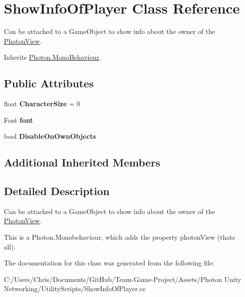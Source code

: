 \hypertarget{class_show_info_of_player}{}\section{Show\+Info\+Of\+Player Class Reference}
\label{class_show_info_of_player}


Can be attached to a Game\+Object to show info about the owner of the \hyperlink{class_photon_view}{Photon\+View}.  




Inherits \hyperlink{class_photon_1_1_mono_behaviour}{Photon.\+Mono\+Behaviour}.

\subsection*{Public Attributes}
\begin{DoxyCompactItemize}
\item 
float {\bfseries Character\+Size} = 0\hypertarget{class_show_info_of_player_a3ca691afacbede3ba6003e9fe9382122}{}\label{class_show_info_of_player_a3ca691afacbede3ba6003e9fe9382122}

\item 
Font {\bfseries font}\hypertarget{class_show_info_of_player_ad21009b17d92004b3172cc7e63eac70e}{}\label{class_show_info_of_player_ad21009b17d92004b3172cc7e63eac70e}

\item 
bool {\bfseries Disable\+On\+Own\+Objects}\hypertarget{class_show_info_of_player_a4f3344f49a450e169bce73cb3c1acd42}{}\label{class_show_info_of_player_a4f3344f49a450e169bce73cb3c1acd42}

\end{DoxyCompactItemize}
\subsection*{Additional Inherited Members}


\subsection{Detailed Description}
Can be attached to a Game\+Object to show info about the owner of the \hyperlink{class_photon_view}{Photon\+View}. 

This is a Photon.\+Monobehaviour, which adds the property photon\+View (that\textquotesingle{}s all). 

The documentation for this class was generated from the following file\+:\begin{DoxyCompactItemize}
\item 
C\+:/\+Users/\+Chris/\+Documents/\+Git\+Hub/\+Team-\/\+Game-\/\+Project/\+Assets/\+Photon Unity Networking/\+Utility\+Scripts/Show\+Info\+Of\+Player.\+cs\end{DoxyCompactItemize}
